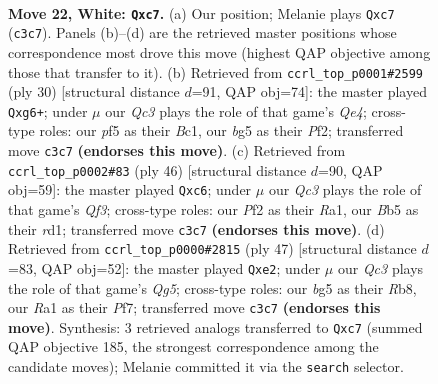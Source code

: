 \documentclass[11pt]{article}
\begin{document}
\clearpage

\begin{figure}[p]\centering
\begin{subfigure}{0.46\textwidth}\centering
\resizebox{\linewidth}{!}{%
\newchessgame
\chessboard[
  setfen={rn2k2r/2qb4/3p4/pB1Pppb1/6p1/2Q5/PPP2PP1/R1B1RK2 w kq - 2 22},
  showmover=false,
  pgfstyle=straightmove, color=movearrow, markmove={c3-c7}
]}
\caption{}
\end{subfigure}\hfill
\begin{subfigure}{0.46\textwidth}\centering
\resizebox{\linewidth}{!}{%
\newchessgame
\chessboard[
  setfen={rn1qk2r/1p1b4/p3pbp1/1B5p/2P1Q3/8/PP3PPP/R1B2RK1 w kq - 0 16},
  showmover=false,
  pgfstyle=straightmove, color=movearrow, markmove={e4-g6}
]}
\caption{}
\end{subfigure}
\\[4pt]
\begin{subfigure}{0.46\textwidth}\centering
\resizebox{\linewidth}{!}{%
\newchessgame
\chessboard[
  setfen={2r2k2/p4pp1/2q1pn1p/2b5/p1B4P/5QP1/1PP1RPK1/R1Br4 w - - 2 24},
  showmover=false,
  pgfstyle=straightmove, color=movearrow, markmove={f3-c6}
]}
\caption{}
\end{subfigure}\hfill
\begin{subfigure}{0.46\textwidth}\centering
\resizebox{\linewidth}{!}{%
\newchessgame
\chessboard[
  setfen={1rb1k2r/5pp1/p1nb4/3PpP1p/2B1P1q1/1N6/RP2QB1P/5R1K b k - 0 24},
  showmover=false,
  pgfstyle=straightmove, color=movearrow, markmove={g4-e2}
]}
\caption{}
\end{subfigure}
\caption{\textbf{Move 22, White: \texttt{Qxc7}.} (a) Our position; Melanie plays \texttt{Qxc7} (\texttt{c3c7}). Panels (b)--(d) are the retrieved master positions whose correspondence most drove this move (highest QAP objective among those that transfer to it). (b) Retrieved from \texttt{ccrl\_top\_p0001\#2599} (ply 30) [structural distance $d$=91, QAP obj=74]: the master played \texttt{Qxg6+}; under $\mu$ our \emph{Qc3} plays the role of that game's \emph{Qe4}; cross-type roles: our \emph{p}f5 as their \emph{B}c1, our \emph{b}g5 as their \emph{P}f2; transferred move \texttt{c3c7} \textbf{(endorses this move)}. (c) Retrieved from \texttt{ccrl\_top\_p0002\#83} (ply 46) [structural distance $d$=90, QAP obj=59]: the master played \texttt{Qxc6}; under $\mu$ our \emph{Qc3} plays the role of that game's \emph{Qf3}; cross-type roles: our \emph{P}f2 as their \emph{R}a1, our \emph{B}b5 as their \emph{r}d1; transferred move \texttt{c3c7} \textbf{(endorses this move)}. (d) Retrieved from \texttt{ccrl\_top\_p0000\#2815} (ply 47) [structural distance $d$=83, QAP obj=52]: the master played \texttt{Qxe2}; under $\mu$ our \emph{Qc3} plays the role of that game's \emph{Qg5}; cross-type roles: our \emph{b}g5 as their \emph{R}b8, our \emph{R}a1 as their \emph{P}f7; transferred move \texttt{c3c7} \textbf{(endorses this move)}. Synthesis: 3 retrieved analogs transferred to \texttt{Qxc7} (summed QAP objective 185, the strongest correspondence among the candidate moves); Melanie committed it via the \texttt{search} selector.}
\label{fig:thought-m42}
\end{figure}
\end{document}
